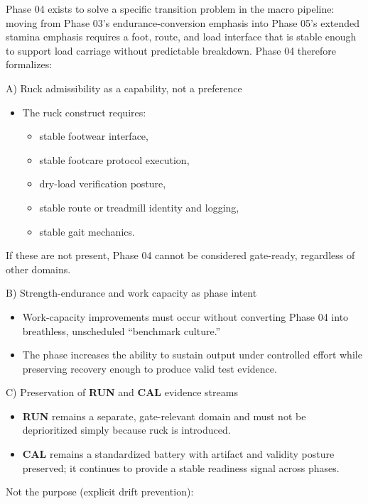 \documentclass[10pt]{article}
\begin{document}
Phase 04 exists to solve a specific transition problem in the macro pipeline: moving from Phase 03’s endurance-conversion emphasis into Phase 05’s extended stamina emphasis requires a foot, route, and load interface that is stable enough to support load carriage without predictable breakdown. Phase 04 therefore formalizes:

A) Ruck admissibility as a capability, not a preference

\begin{itemize}
\item The ruck construct requires:
  \begin{itemize}
  \item stable footwear interface,
  \item stable footcare protocol execution,
  \item dry-load verification posture,
  \item stable route or treadmill identity and logging,
  \item stable gait mechanics.
  \end{itemize}
\end{itemize}

If these are not present, Phase 04 cannot be considered gate-ready, regardless of other domains.

B) Strength-endurance and work capacity as phase intent

\begin{itemize}
\item Work-capacity improvements must occur without converting Phase 04 into breathless, unscheduled “benchmark culture.”
\item The phase increases the ability to sustain output under controlled effort while preserving recovery enough to produce valid test evidence.
\end{itemize}

C) Preservation of \textbf{RUN} and \textbf{CAL} evidence streams

\begin{itemize}
\item \textbf{RUN} remains a separate, gate-relevant domain and must not be deprioritized simply because ruck is introduced.
\item \textbf{CAL} remains a standardized battery with artifact and validity posture preserved; it continues to provide a stable readiness signal across phases.
\end{itemize}

Not the purpose (explicit drift prevention):
\end{document}
